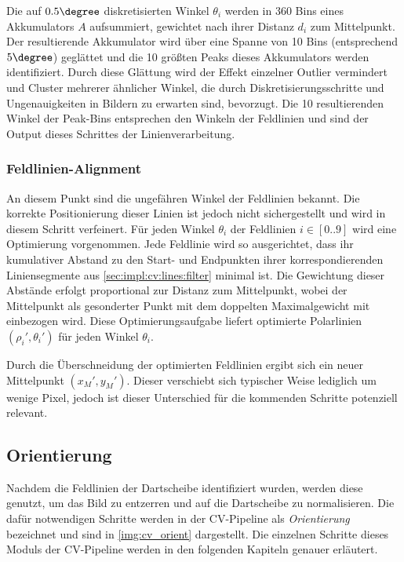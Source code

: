 Die auf $0.5\degree$ diskretisierten Winkel $\theta_i$ werden in 360 Bins eines Akkumulators $A$ aufsummiert, gewichtet nach ihrer Distanz $d_i$ zum Mittelpunkt. Der resultierende Akkumulator wird über eine Spanne von 10 Bins (entsprechend $5\degree$) geglättet und die 10 größten Peaks dieses Akkumulators werden identifiziert. Durch diese Glättung wird der Effekt einzelner Outlier vermindert und Cluster mehrerer ähnlicher Winkel, die durch Diskretisierungsschritte und Ungenauigkeiten in Bildern zu erwarten sind, bevorzugt. Die 10 resultierenden Winkel der Peak-Bins entsprechen den Winkeln der Feldlinien und sind der Output dieses Schrittes der Linienverarbeitung.

\subsubsection{Feldlinien-Alignment}
\label{sec:impl:cv:lines:lines_align}

An diesem Punkt sind die ungefähren Winkel der Feldlinien bekannt. Die korrekte Positionierung dieser Linien ist jedoch nicht sichergestellt und wird in diesem Schritt verfeinert. Für jeden Winkel $\theta_i$ der Feldlinien $i \in [0..9]$ wird eine Optimierung vorgenommen. Jede Feldlinie wird so ausgerichtet, dass ihr kumulativer Abstand zu den Start- und Endpunkten ihrer korrespondierenden Liniensegmente aus \autoref{sec:impl:cv:lines:filter} minimal ist. Die Gewichtung dieser Abstände erfolgt proportional zur Distanz zum Mittelpunkt, wobei der Mittelpunkt als gesonderter Punkt mit dem doppelten Maximalgewicht mit einbezogen wird. Diese Optimierungsaufgabe liefert optimierte Polarlinien $(\rho_i', \theta_i')$ für jeden Winkel $\theta_i$.

Durch die Überschneidung der optimierten Feldlinien ergibt sich ein neuer Mittelpunkt $(x_M', y_M')$. Dieser verschiebt sich typischer Weise lediglich um wenige Pixel, jedoch ist dieser Unterschied für die kommenden Schritte potenziell relevant.



\subsection{Orientierung}
\label{sec:impl:cv:orient}

Nachdem die Feldlinien der Dartscheibe identifiziert wurden, werden diese genutzt, um das Bild zu entzerren und auf die Dartscheibe zu normalisieren. Die dafür notwendigen Schritte werden in der CV-Pipeline als \textit{Orientierung} bezeichnet und sind in \autoref{img:cv_orient} dargestellt. Die einzelnen Schritte dieses Moduls der CV-Pipeline werden in den folgenden Kapiteln genauer erläutert.

